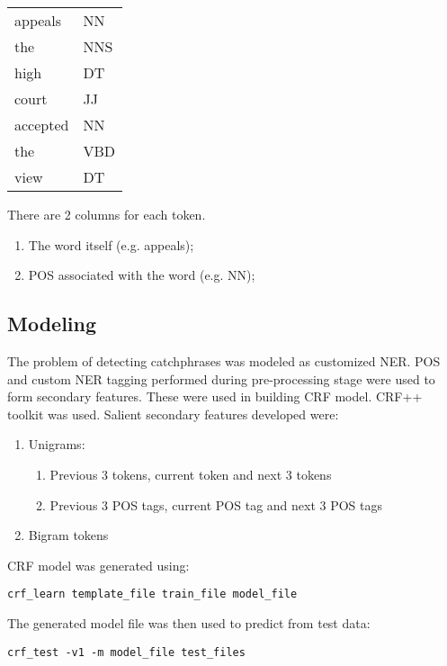 \begin{center}
\begin{tabular}[h]{ l  l }
			appeals    &	NN\\
			the    &	NNS\\
			high   &	DT\\
			court    &	JJ\\
			accepted 	   & NN\\
			the    &	VBD\\
			view    &	DT\\
			\end{tabular}
\label{tab:testing}
\end{center}
There are 2 columns for each token.
\begin{enumerate}
	\item The word itself (e.g. appeals);
	\item POS associated with the word (e.g. NN);
\end{enumerate}

\subsection{Modeling}
The problem of detecting catchphrases was modeled as customized NER. POS and custom NER tagging performed during pre-processing stage were used to form secondary features. These were used  in building CRF model. CRF++ \cite{crfpp} toolkit was used. Salient secondary features developed were:
\begin{enumerate}
	\item Unigrams:
	\begin{enumerate}
		\item Previous 3 tokens, current token and next 3 tokens
		\item Previous 3 POS tags, current POS tag and next 3 POS tags
	\end{enumerate}
	\item Bigram tokens
\end{enumerate}
CRF model was generated using:

\lstinline|crf_learn template_file train_file model_file|

The generated model file was then used to predict from test data:

\lstinline|crf_test -v1 -m model_file test_files|

